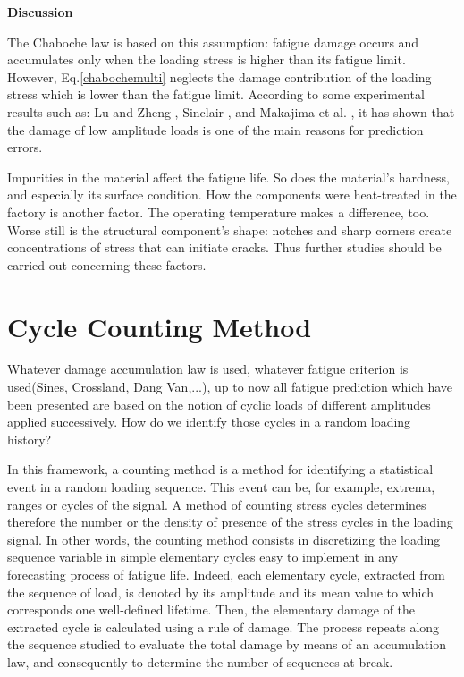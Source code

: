 \textbf{Discussion}

The Chaboche law is based on this assumption: fatigue damage occurs and accumulates only when the loading stress is higher than its fatigue limit. However, Eq.\eqref{chabochemulti} neglects the damage contribution of the loading stress which is lower than the fatigue limit. According to some experimental results such as: Lu and Zheng \cite{xi2008strengthening} \cite{xi2009strengthening} \cite{xi2009changes}, Sinclair \cite{sinclair1952investigation}, and Makajima et al. \cite{nakajima2007coaxing}, it has shown that the damage of low amplitude loads is one
of the main reasons for prediction errors. 

Impurities in the material affect the fatigue life. So does the material's hardness, and especially its surface condition. How the components were heat-treated in the factory is another factor. The operating temperature makes a difference, too. Worse still is the structural component's shape: notches and sharp corners create concentrations of stress that can initiate cracks. Thus further studies should be carried out concerning these factors.

\section{Cycle Counting Method}
\label{sec:5.1}
Whatever damage accumulation law is used, whatever fatigue criterion is used(Sines, Crossland, Dang Van,...), up to now all fatigue prediction which have been presented are based on the notion of cyclic loads of different amplitudes applied successively. How do we identify those cycles in a random loading history?

In this framework, a counting method is a method for identifying a statistical event
in a random loading sequence. This event can be, for example, extrema,
ranges or cycles of the signal. A method of counting stress cycles determines
therefore the number or the density of presence of the stress cycles in the loading signal.
In other words, the counting method consists in discretizing the loading sequence
variable in simple elementary cycles easy to implement in any forecasting process
of fatigue life. Indeed, each elementary cycle, extracted from the sequence of
load, is denoted by its amplitude and its mean value to which corresponds one
well-defined lifetime. Then, the elementary damage of the extracted cycle is calculated using
a rule of damage. The process repeats along the sequence studied to evaluate
the total damage by means of an accumulation law, and consequently to determine the number of
sequences at break.

